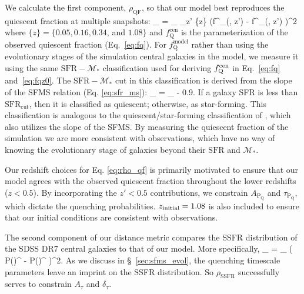 We calculate the first component, $\rho_\mathrm{QF}$, so that our model 
best reproduces the quiescent fraction at multiple snapshots:
\beq \label{eq:rho_qf}
\rho_ = \sum\limits_ \sum\limits_{z' \in \{z\}} 
\left(f^_(, z') - f^_(, z') \right)^2
\eeq
where $\{z\} = \{0.05, 0.16, 0.34$, and $1.08\}$ and $f^\mathrm{cen}_\mathrm{Q}$
is the parameterization of the observed quiescent fraction (Eq.~\ref{eq:fq}). 
For $f^\mathrm{model}_\mathrm{Q}$ rather than using 
the evolutionary stages of the simulation 
central galaxies in the model, we measure it using the same 
$\mathrm{SFR} - \mathcal{M}_*$ classification used for deriving 
$f_\mathrm{Q}^\mathrm{cen}$ in Eq.~\ref{eq:fq} and~\ref{eq:fqz0}. 
The $\mathrm{SFR} - \mathcal{M}_*$ cut in this classification
is derived from the slope of the SFMS relation (Eq. \ref{eq:sfr_ms}): 
\beq \label{eq:sfr_cut}
\log\;_ = \log\;\avgSFR_ - 0.9. 
\eeq
If a galaxy SFR is less than $\mathrm{SFR}_\mathrm{cut}$, then it is 
classified as quiescent; otherwise, as star-forming. This classification
is analogous to the quiescent/star-forming classification of 
\cite{Moustakas:2013aa}, which also utilizes the slope of the SFMS. By 
measuring the quiescent fraction of the simulation we are more consistent 
with observations, which have no way of knowing the evolutionary stage
of galaxies beyond their $\mathrm{SFR}$ and $\mathcal{M}_*$. 

Our redshift choices for Eq. \ref{eq:rho_qf} is primarily 
motivated to ensure that our model agrees with the observed 
quiescent fraction throughout the lower redshifts ($z < 0.5$). 
By incorporating the $z' < 0.5$ contributions, we constrain 
$A_\mathrm{P_Q}$ and $\tau_\mathrm{P_Q}$, which dictate the 
quenching probabilities. $z_\mathrm{initial}=1.08$ is also included to 
ensure that our initial conditions are consistent with observations. 

The second component of our distance metric compares the SSFR distribution 
of the SDSS DR7 central galaxies to that of our model. More specifically, 
\beq \label{eq:rho_ssfr}
\rho_ = \sum\limits_ 
\left( P()^ - P()^ \right)^2.
\eeq
As we discuss in \S~\ref{sec:sfms_evol}, the quenching timescale
parameters leave an imprint on the SSFR distribution. So $\rho_\mathrm{SSFR}$ 
successfully serves to constrain $A_\tau$ and $\delta_\tau$. 


